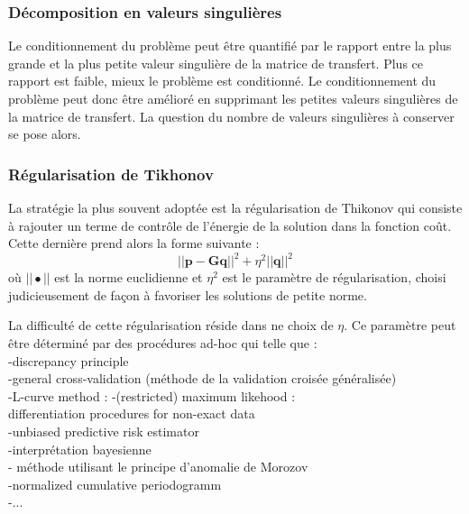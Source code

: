 \subsubsection{Décomposition en valeurs singulières}


Le conditionnement du problème peut être quantifié par le rapport entre la plus grande et la plus petite valeur singulière de la matrice de transfert. Plus ce rapport est faible, mieux le problème est conditionné. Le conditionnement du problème peut donc être amélioré en supprimant les petites valeurs singulières de la matrice de transfert. La question du nombre de valeurs singulières à conserver se pose alors. 



\subsubsection{Régularisation de Tikhonov}

La stratégie la plus souvent adoptée est la régularisation de Thikonov \citep{Tikhonov1963} qui consiste à rajouter un terme de contrôle de l'énergie de la solution dans la fonction coût. Cette dernière prend alors la forme suivante : 
\begin{equation}
	||\bm{p}-\bm{G}\bm{q}||^2 + \eta^2||\bm{q}||^2
\end{equation}
où $||\bullet||$ est la norme euclidienne et $\eta^2$ est le paramètre de régularisation, choisi judicieusement de façon à favoriser les solutions de petite norme.

La difficulté de cette régularisation réside dans ne choix de $\eta$. Ce paramètre peut être déterminé par des procédures ad-hoc qui telle que : \\
-discrepancy principle\\
-general cross-validation (méthode de la validation croisée généralisée)\\
-L-curve method : %
-(restricted) maximum likehood : \\%
differentiation procedures for non-exact data\\
-unbiased predictive risk estimator\\
-interprétation bayesienne \citep{Pereira2015}\\
- méthode utilisant le principe d’anomalie de Morozov\\
-normalized cumulative periodogramm\\
-...\\

